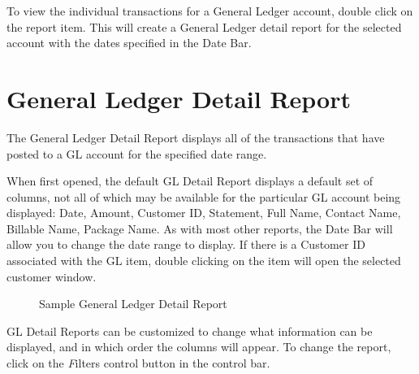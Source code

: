 To view the individual transactions for a General Ledger account, double
click on the report item.  This will create a General Ledger detail
report for the selected account with the dates specified in the Date
Bar.

\section{General Ledger Detail Report}

The General Ledger Detail Report displays all of the transactions that
have posted to a GL account for the specified date range.

When first opened, the default GL Detail Report displays a default set
of columns, not all of which may be available for the particular GL
account being displayed:  Date, Amount, Customer ID, Statement, Full
Name, Contact Name, Billable Name, Package Name.  As with most other
reports, the Date Bar will allow you to change the date range to
display.  If there is a Customer ID associated with the GL item, double
clicking on the item will open the selected customer window.

\begin{figure}[hbtp]
\caption{ \label{fig:GeneralLedgerDetailReport} Sample General Ledger Detail Report}
\end{figure}

GL Detail Reports can be customized to change what information can be
displayed, and in which order the columns will appear.  To change the
report, click on the {\emph Filters} control button in the control bar.

